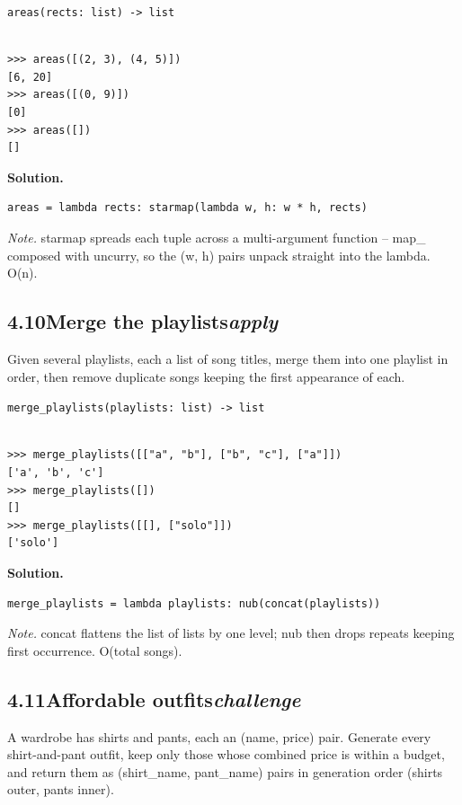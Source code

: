 \documentclass[10pt,letterpaper]{book}
\begin{document}
\noindent\texttt{areas(rects: list) -> list}
\begin{lstlisting}[style=ex]

>>> areas([(2, 3), (4, 5)])
[6, 20]
>>> areas([(0, 9)])
[0]
>>> areas([])
[]

\end{lstlisting}
\noindent\textbf{Solution.}
\begin{lstlisting}[style=code]
areas = lambda rects: starmap(lambda w, h: w * h, rects)
\end{lstlisting}
\noindent\textit{Note.} starmap spreads each tuple across a multi-argument function -- map\_ composed with uncurry, so the (w, h) pairs unpack straight into the lambda. O(n).

\subsection*{4.10\quad Merge the playlists\hfill\textnormal{\textit{apply}}}
Given several playlists, each a list of song titles, merge them into one playlist in order, then remove duplicate songs keeping the first appearance of each.

\noindent\texttt{merge\_playlists(playlists: list) -> list}
\begin{lstlisting}[style=ex]

>>> merge_playlists([["a", "b"], ["b", "c"], ["a"]])
['a', 'b', 'c']
>>> merge_playlists([])
[]
>>> merge_playlists([[], ["solo"]])
['solo']

\end{lstlisting}
\noindent\textbf{Solution.}
\begin{lstlisting}[style=code]
merge_playlists = lambda playlists: nub(concat(playlists))
\end{lstlisting}
\noindent\textit{Note.} concat flattens the list of lists by one level; nub then drops repeats keeping first occurrence. O(total songs).

\subsection*{4.11\quad Affordable outfits\hfill\textnormal{\textit{challenge}}}
A wardrobe has shirts and pants, each an (name, price) pair. Generate every shirt-and-pant outfit, keep only those whose combined price is within a budget, and return them as (shirt\_name, pant\_name) pairs in generation order (shirts outer, pants inner).
\end{document}
